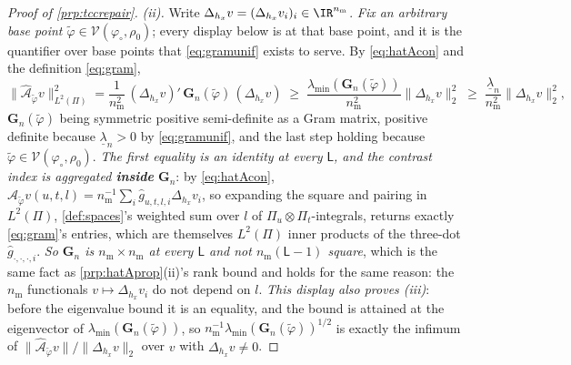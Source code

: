 \begin{proof}[Proof of \cref{prp:tccrepair}]
\emph{(ii).} Write $\Delta_{h_x}v=(\Delta_{h_x}v_i)_i\in\IR^{n_{\mathrm m}}$. \emph{Fix an arbitrary
base point $\tilde\varphi\in\mathcal V(\varphi_\circ,\rho_0)$}; every display below is at that base
point, and it is the quantifier over base points that \eqref{eq:gramunif} exists to serve. By
\eqref{eq:hatAcon} and the definition \eqref{eq:gram},
\begin{equation}\label{eq:gramlow}
\big\|\hat{\mathcal A}_{\tilde\varphi}v\big\|_{L^{2}(\Pi)}^{2}
=\frac1{n_{\mathrm m}^{2}}\,(\Delta_{h_x}v)'\,\mathbf G_n(\tilde\varphi)\,(\Delta_{h_x}v)
\;\ge\;\frac{\lambda_{\min}(\mathbf G_n(\tilde\varphi))}{n_{\mathrm m}^{2}}\big\|\Delta_{h_x}v\big\|_{2}^{2}
\;\ge\;\frac{\underline\lambda_n}{n_{\mathrm m}^{2}}\big\|\Delta_{h_x}v\big\|_{2}^{2} ,
\end{equation}
$\mathbf G_n(\tilde\varphi)$ being symmetric positive semi-definite as a Gram matrix, positive definite
because $\underline\lambda_n>0$ by \eqref{eq:gramunif}, and the last step holding because
$\tilde\varphi\in\mathcal V(\varphi_\circ,\rho_0)$.
\emph{The first equality is an identity at every $\mathsf L$, and the contrast index is aggregated
\textbf{inside} $\mathbf G_n$}: by \eqref{eq:hatAcon}, $\hat{\mathcal A}_{\tilde\varphi}v(u,t,l)
=n_{\mathrm m}^{-1}\sum_i\hat g_{u,t,l,i}\Delta_{h_x}v_i$, so expanding the square and pairing in
$L^{2}(\Pi)$, \cref{def:spaces}'s weighted sum over $l$ of $\Pi_u\otimes\Pi_t$-integrals, returns
exactly \eqref{eq:gram}'s entries, which are themselves $L^{2}(\Pi)$ inner products of the three-dot
$\hat g_{\cdot,\cdot,\cdot,i}$. \emph{So $\mathbf G_n$ is $n_{\mathrm m}\times n_{\mathrm m}$ at every
$\mathsf L$ and not $n_{\mathrm m}(\mathsf L-1)$ square}, which is the same fact as
\cref{prp:hatAprop}\textup{(ii)}'s rank bound and holds for the same reason: the $n_{\mathrm m}$
functionals $v\mapsto\Delta_{h_x}v_i$ do not depend on $l$. \emph{This display also proves (iii)}: before the
eigenvalue bound it is an equality, and the bound is attained at the eigenvector of
$\lambda_{\min}(\mathbf G_n(\tilde\varphi))$, so $n_{\mathrm m}^{-1}\lambda_{\min}(\mathbf G_n(\tilde\varphi))^{1/2}$
is exactly the infimum of $\|\hat{\mathcal A}_{\tilde\varphi}v\|/\|\Delta_{h_x}v\|_2$ over $v$ with
$\Delta_{h_x}v\ne0$.


\end{proof}
